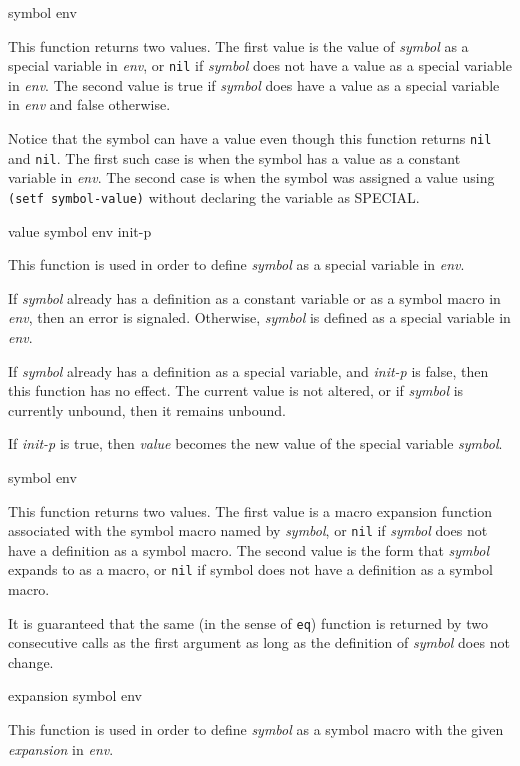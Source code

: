  {symbol env}

This function returns two values.  The first value is the value of
\textit{symbol} as a special variable in \textit{env}, or \texttt{nil} if \textit{symbol}
does not have a value as a special variable in \textit{env}.  The
second value is true if \textit{symbol} does have a value as a special
variable in \textit{env} and false otherwise.

Notice that the symbol can have a value even though this function
returns \texttt{nil} and \texttt{nil}.  The first such case is when the symbol has a
value as a constant variable in \textit{env}.  The second case is when
the symbol was assigned a value using \texttt{(setf symbol-value)}
without declaring the variable as SPECIAL.

 {value symbol env init-p}

This function is used in order to define \textit{symbol} as a special
variable in \textit{env}.

If \textit{symbol} already has a definition as a constant variable or as a
symbol macro in \textit{env}, then an error is signaled.
Otherwise, \textit{symbol} is defined as a special variable in \textit{env}.

If \textit{symbol} already has a definition as a special variable, and
\textit{init-p} is false, then this function has no effect.  The
current value is not altered, or if \textit{symbol} is currently
unbound, then it remains unbound.

If \textit{init-p} is true, then \textit{value} becomes the new
value of the special variable \textit{symbol}.

 {symbol env}

This function returns two values.  The first value is a macro
expansion function associated with the symbol macro named by \textit{symbol},
or \texttt{nil} if \textit{symbol} does not have a definition as a symbol
macro.  The second value is the form that \textit{symbol} expands to as a
macro, or \texttt{nil} if symbol does not have a definition as a
symbol macro.

It is guaranteed that the same (in the sense of \texttt{eq}) function is
returned by two consecutive calls as the first argument as long as
the definition of \textit{symbol} does not change.

 {expansion symbol env}

This function is used in order to define \textit{symbol} as a symbol macro
with the given \textit{expansion} in \textit{env}.

